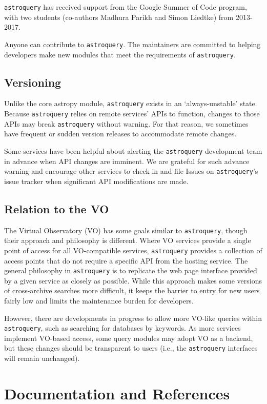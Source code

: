 \documentclass[twocolumn]{aastex61}
\newcommand{\package}[1]{\texttt{#1}\xspace}
\newcommand{\astroquery}{\package{astroquery}}
\begin{document}
\astroquery has received support from the Google Summer of Code
program, with two students (co-authors Madhura Parikh and Simon Liedtke)
from 2013-2017.

Anyone can contribute to \astroquery.  The maintainers are committed to helping
developers make new modules that meet the requirements of \astroquery.

\subsection{Versioning}
Unlike the core astropy module, \astroquery exists in an `always-unstable' state.
Because \astroquery relies on remote services' APIs to function, changes to those
APIs may break \astroquery without warning.  For that reason, we sometimes have
frequent or sudden version releases to accommodate remote changes.

Some services have been helpful about alerting the \astroquery development team
in advance when API changes are imminent.  We are grateful for such advance
warning and encourage other services to check in and file Issues on \astroquery's
issue tracker when significant API modifications are made.

\subsection{Relation to the VO}

The Virtual Observatory (VO) has some goals similar to \astroquery,
though their approach and philosophy is different.  Where VO services provide a
single point of access for all VO-compatible services, \astroquery
provides a collection of access points that do not require a specific API from
the hosting service.  The general philosophy in \astroquery is to
replicate the web page interface provided by a given service as closely as
possible.  While this approach makes some versions of cross-archive searches
more difficult, it keeps the barrier to entry for new users fairly low and limits
the maintenance burden for developers.

However, there are developments in progress to allow more VO-like queries
within \astroquery, such as searching for databases by keywords.  As more
services implement VO-based access, some query modules may adopt VO as a backend,
but these changes should be transparent to users (i.e., the \astroquery
interfaces will remain unchanged).

\section{Documentation and References}
\end{document}
